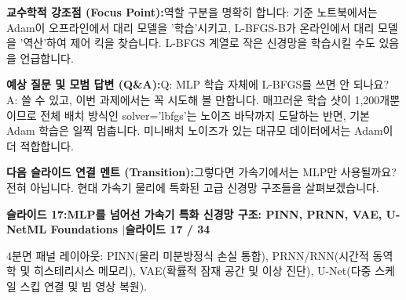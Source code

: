 \documentclass[11pt,a4paper]{article}
\begin{document}
\begin{tcolorbox}[colback=lightbg,colframe=bordergray,left=6pt,right=6pt,top=3pt,bottom=3pt,boxrule=0.6pt,arc=2.5pt]
\small
\noindent\textbf{\color{navy}교수학적 강조점 (Focus Point):}\enspace 역할 구분을 명확히 합니다: 기준 노트북에서는 Adam이 오프라인에서 대리 모델을 '학습'시키고, L-BFGS-B가 온라인에서 대리 모델을 '역산'하여 제어 킥을 찾습니다. L-BFGS 계열로 작은 신경망을 학습시킬 수도 있음을 언급합니다.\par\vspace{0.3em}
\noindent\textbf{\color{successgreen}예상 질문 및 모범 답변 (Q\&A):}\enspace Q: MLP 학습 자체에 L-BFGS를 쓰면 안 되나요? A: 쓸 수 있고, 이번 과제에서는 꼭 시도해 볼 만합니다. 매끄러운 학습 샷이 1,200개뿐이므로 전체 배치 방식인 solver='lbfgs'는 노이즈 바닥까지 도달하는 반면, 기본 Adam 학습은 일찍 멈춥니다. 미니배치 노이즈가 있는 대규모 데이터에서는 Adam이 더 적합합니다.\par\vspace{0.3em}
\noindent\textbf{\color{accent}다음 슬라이드 연결 멘트 (Transition):}\enspace 그렇다면 가속기에서는 MLP만 사용될까요? 전혀 아닙니다. 현대 가속기 물리에 특화된 고급 신경망 구조들을 살펴보겠습니다.
\end{tcolorbox}
\clearpage
\hypertarget{slide.17}{}
{}
\noindent\begin{tcolorbox}[colback=navy,colframe=navy,left=6pt,right=6pt,top=3pt,bottom=3pt,boxrule=0pt,arc=2pt]
{\large\bfseries\color{white}슬라이드 17:\enspace MLP를 넘어선 가속기 특화 신경망 구조: PINN, PRNN, VAE, U-Net}\hfill{\footnotesize\bfseries\color{white!85!lightbg}ML Foundations \enspace$|$\enspace 슬라이드 17 / 34}
\end{tcolorbox}
\vspace{0.2em}
\begin{tcolorbox}[colback=lightbg,colframe=bordergray,title={\footnotesize\bfseries\color{darkgray}슬라이드 시각 구성 요약},fontupper=\small,left=6pt,right=6pt,top=2.5pt,bottom=2.5pt,boxrule=0.6pt,arc=2.5pt]
4분면 패널 레이아웃: PINN(물리 미분방정식 손실 통합), PRNN/RNN(시간적 동역학 및 히스테리시스 메모리), VAE(확률적 잠재 공간 및 이상 진단), U-Net(다중 스케일 스킵 연결 및 빔 영상 복원).
\end{tcolorbox}
\vspace{0.2em}
\end{document}
